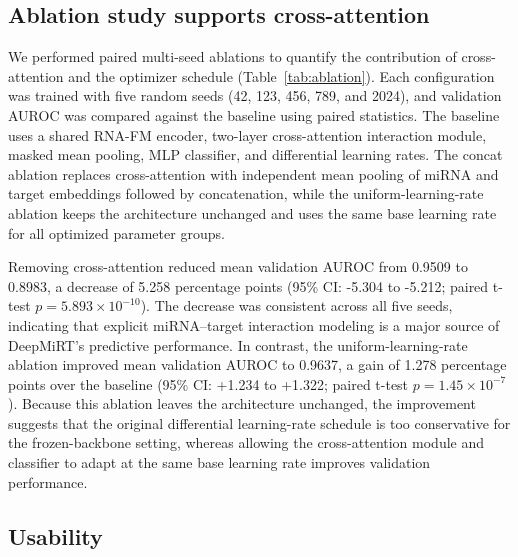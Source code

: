 \documentclass[10pt,a4paper]{article}
\begin{document}
\subsection{Ablation study supports cross-attention}

We performed paired multi-seed ablations to quantify the contribution of cross-attention and the optimizer schedule (Table~\ref{tab:ablation}). Each configuration was trained with five random seeds (42, 123, 456, 789, and 2024), and validation AUROC was compared against the baseline using paired statistics. The baseline uses a shared RNA-FM encoder, two-layer cross-attention interaction module, masked mean pooling, MLP classifier, and differential learning rates. The concat ablation replaces cross-attention with independent mean pooling of miRNA and target embeddings followed by concatenation, while the uniform-learning-rate ablation keeps the architecture unchanged and uses the same base learning rate for all optimized parameter groups.

Removing cross-attention reduced mean validation AUROC from 0.9509 to 0.8983, a decrease of 5.258 percentage points (95\% CI: -5.304 to -5.212; paired t-test $p = 5.893 \times 10^{-10}$). The decrease was consistent across all five seeds, indicating that explicit miRNA--target interaction modeling is a major source of DeepMiRT's predictive performance. In contrast, the uniform-learning-rate ablation improved mean validation AUROC to 0.9637, a gain of 1.278 percentage points over the baseline (95\% CI: +1.234 to +1.322; paired t-test $p = 1.45 \times 10^{-7}$). Because this ablation leaves the architecture unchanged, the improvement suggests that the original differential learning-rate schedule is too conservative for the frozen-backbone setting, whereas allowing the cross-attention module and classifier to adapt at the same base learning rate improves validation performance.

\subsection{Usability}
\end{document}
